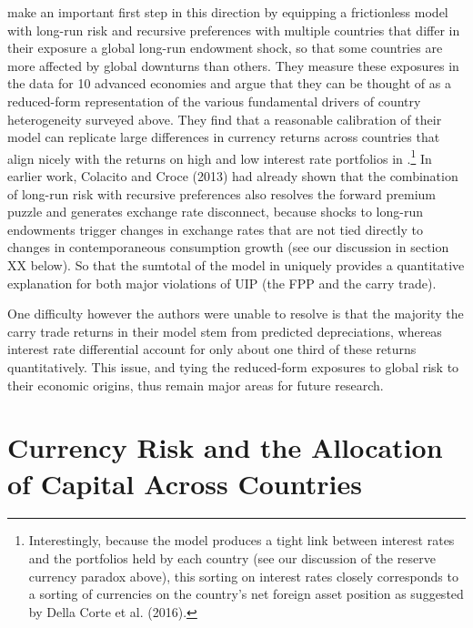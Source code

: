 \documentclass{ar-1col}
\begin{document}
\citet{ColacitoCroceHoHoward2018} make an important first step in this direction by equipping a frictionless model with long-run risk and recursive preferences with multiple countries that differ in their exposure a global long-run endowment shock, so that some countries are more affected by global downturns than others. They measure these exposures in the data for 10 advanced economies and argue that they can be thought of as a reduced-form representation of the various fundamental drivers of country heterogeneity surveyed above. They find that a reasonable calibration of their model can replicate large differences in currency returns across countries that align nicely with the returns on high and low interest rate portfolios in \cite{LustigRoussanovVerdelhan2011}.\footnote{ Interestingly, because the model produces a tight link between interest rates and the portfolios held by each country (see our discussion of the reserve currency paradox above), this sorting on interest rates closely corresponds to a sorting of currencies on the country's net foreign asset position as suggested by Della Corte et al. (2016).} 
In earlier work, Colacito and Croce (2013) had already shown that the combination of long-run risk with recursive preferences also resolves the forward premium puzzle and generates exchange rate disconnect, because shocks to long-run endowments trigger changes in exchange rates that are not tied directly to changes in contemporaneous consumption growth (see our discussion in section XX below). So that the sumtotal of the model in \citet{ColacitoCroceHoHoward2018} uniquely provides a quantitative explanation for both major violations of UIP (the FPP and the carry trade).

One difficulty however the authors were unable to resolve is that the majority the carry trade returns in their model stem from predicted depreciations, whereas interest rate differential account for only about one third of these returns quantitatively. This issue, and tying the reduced-form exposures to global risk to their economic origins, thus remain major areas for future research.

\section{Currency Risk and the Allocation of Capital Across Countries}
\end{document}
